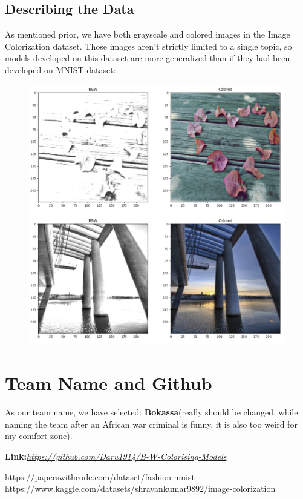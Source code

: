 \documentclass[]{article}
\begin{document}
	\subsection{Describing the Data}
	
	As mentioned prior, we have both grayscale and colored images in the Image Colorization dataset. Those images aren't strictly limited to a single topic, so models developed on this dataset are more generalized than if they had been developed on MNIST dataset:
	\begin{figure}[H]
		\includegraphics{image1.png}
	\end{figure}
	
	\section{Team Name and Github}
	
	As our team name, we have selected: \textbf{Bokassa}(really should be changed. while naming the team after an African war criminal is funny, it is also too weird for my comfort zone).
	
	\textbf{Link:}\href{https://github.com/Daru1914/B-W-Colorising-Models}{\emph{https://github.com/Daru1914/B-W-Colorising-Models}}
	
	\begin{thebibliography}{9}
		 https://paperswithcode.com/dataset/fashion-mnist
		https://www.kaggle.com/datasets/shravankumar9892/image-colorization
	\end{thebibliography}
	
\end{document}
